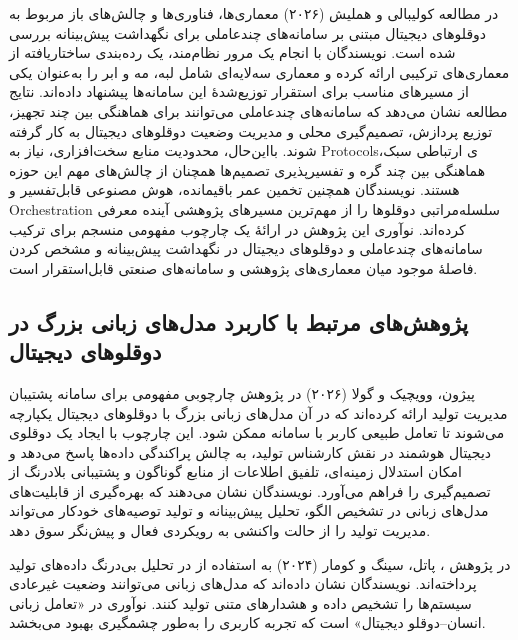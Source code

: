 \documentclass[a4paper,fleqn]{report}
\begin{document}
در مطالعه
کولیبالی و هملیش (۲۰۲۶)
\cite{coulibaly2026madtdt}
معماری‌ها، فناوری‌ها و چالش‌های باز مربوط به دوقلوهای دیجیتال مبتنی بر سامانه‌های چندعاملی برای نگهداشت پیش‌بینانه بررسی شده است. نویسندگان با انجام یک مرور نظام‌مند، یک رده‌بندی ساختاریافته از معماری‌های ترکیبی
ارائه کرده و معماری سه‌لایه‌ای شامل لبه، مه و ابر را به‌عنوان یکی از مسیرهای مناسب برای استقرار توزیع‌شدهٔ این سامانه‌ها پیشنهاد داده‌اند. نتایج مطالعه نشان می‌دهد که سامانه‌های چندعاملی می‌توانند برای هماهنگی بین چند تجهیز، توزیع پردازش، تصمیم‌گیری محلی و مدیریت وضعیت دوقلوهای دیجیتال به کار گرفته شوند. بااین‌حال، محدودیت منابع سخت‌افزاری، نیاز به \glspl{Protocol}ی ارتباطی سبک، هماهنگی بین چند گره و تفسیرپذیری تصمیم‌ها همچنان از چالش‌های مهم این حوزه هستند. نویسندگان همچنین تخمین عمر باقیمانده، هوش مصنوعی قابل‌تفسیر و \gls{Orchestration} سلسله‌مراتبی دوقلوها را از مهم‌ترین مسیرهای پژوهشی آینده معرفی کرده‌اند. نوآوری این پژوهش در ارائهٔ یک چارچوب مفهومی منسجم برای ترکیب سامانه‌های چندعاملی و دوقلوهای دیجیتال در نگهداشت پیش‌بینانه و مشخص کردن فاصلهٔ موجود میان معماری‌های پژوهشی و سامانه‌های صنعتی قابل‌استقرار است.









\subsection{پژوهش‌های مرتبط با کاربرد مدل‌های زبانی بزرگ در دوقلوهای دیجیتال}

پیژون، وویچیک و گولا (۲۰۲۶) در پژوهش 
\cite{Pizon2026integrating} چارچوبی مفهومی برای سامانه پشتیبان مدیریت تولید ارائه کرده‌اند که در آن مدل‌های زبانی بزرگ با دوقلوهای دیجیتال یکپارچه می‌شوند تا تعامل طبیعی کاربر با سامانه ممکن شود. این چارچوب با ایجاد یک دوقلوی دیجیتال هوشمند در نقش کارشناس تولید، به چالش پراکندگی داده‌ها پاسخ می‌دهد و امکان استدلال زمینه‌ای، تلفیق اطلاعات از منابع گوناگون و پشتیبانی بلادرنگ از تصمیم‌گیری را فراهم می‌آورد. نویسندگان نشان می‌دهند که بهره‌گیری از قابلیت‌های مدل‌های زبانی در تشخیص الگو، تحلیل پیش‌بینانه و تولید توصیه‌های خودکار می‌تواند مدیریت تولید را از حالت واکنشی به رویکردی فعال و پیش‌نگر سوق دهد.



در پژوهش \cite{patel2024llmdt}،
پاتل، سینگ و کومار (۲۰۲۴)
   به استفاده از  در تحلیل بی‌درنگ داده‌های تولید پرداخته‌اند. نویسندگان نشان داده‌اند که مدل‌های زبانی می‌توانند وضعیت غیرعادی سیستم‌ها را تشخیص داده و هشدارهای متنی تولید کنند. نوآوری در «تعامل زبانی انسان–دوقلو دیجیتال» است که تجربه کاربری را به‌طور چشمگیری بهبود می‌بخشد.
\end{document}
